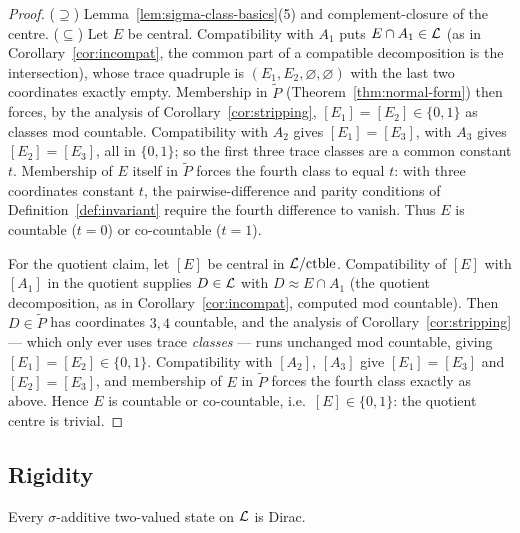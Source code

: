 \begin{proof}
($\supseteq$) Lemma~\ref{lem:sigma-class-basics}(5) and complement-closure of the
centre. ($\subseteq$) Let $E$ be central. Compatibility with $A_1$ puts
$E\cap A_1\in\mathcal{L}$ (as in Corollary~\ref{cor:incompat}, the common part of a
compatible decomposition is the intersection), whose trace quadruple is
$(E_1,E_2,\varnothing,\varnothing)$ with the last two coordinates exactly empty.
Membership in $\widetilde P$ (Theorem~\ref{thm:normal-form}) then forces, by the
analysis of Corollary~\ref{cor:stripping}, $[E_1]=[E_2]\in\{0,1\}$ as classes
mod countable. Compatibility with $A_2$ gives $[E_1]=[E_3]$, with $A_3$ gives
$[E_2]=[E_3]$, all in $\{0,1\}$; so the first three trace classes are a common
constant $t$. Membership of $E$ itself in $\widetilde P$ forces the fourth class
to equal $t$: with three coordinates constant $t$, the pairwise-difference and
parity conditions of Definition~\ref{def:invariant} require the fourth
difference to vanish. Thus $E$ is countable ($t=0$) or co-countable ($t=1$).

For the quotient claim, let $[E]$ be central in $\mathcal{L}/\mathrm{ctble}$.
Compatibility of $[E]$ with $[A_1]$ in the quotient supplies $D\in\mathcal{L}$ with
$D\approx E\cap A_1$ (the quotient decomposition, as in
Corollary~\ref{cor:incompat}, computed mod countable). Then $D\in\widetilde P$
has coordinates $3,4$ countable, and the analysis of
Corollary~\ref{cor:stripping} --- which only ever uses trace \emph{classes} ---
runs unchanged mod countable, giving $[E_1]=[E_2]\in\{0,1\}$. Compatibility
with $[A_2]$, $[A_3]$ give $[E_1]=[E_3]$ and $[E_2]=[E_3]$, and membership of
$E$ in $\widetilde P$ forces the fourth class exactly as above. Hence $E$ is
countable or co-countable, i.e.\ $[E]\in\{0,1\}$: the quotient centre is
trivial.
\end{proof}

\subsection{Rigidity}

\begin{theorem}[rigidity]\label{thm:rigidity}
Every $\sigma$-additive two-valued state on $\mathcal{L}$ is Dirac.
\end{theorem}

